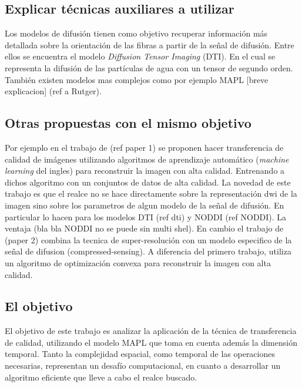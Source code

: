 \documentclass[a4paper,10pt]{article}
\begin{document}
\subsection{Explicar técnicas auxiliares a utilizar}
Los modelos de difusión tienen como objetivo recuperar información más detallada sobre la orientación de las fibras a 
partir de la señal de difusión. Entre ellos se encuentra el modelo \textit{Diffusion Tensor Imaging} (DTI). En el cual 
se representa la difusión de las partículas de agua con un tensor de segundo orden. También existen modelos mas 
complejos como por ejemplo MAPL [breve explicacion] (ref a Rutger). 

\subsection{Otras propuestas con el mismo objetivo}
Por ejemplo en el trabajo de (ref paper 1) se proponen hacer transferencia de 
calidad de imágenes utilizando algoritmos de aprendizaje automático 
(\textit{machine learning} del ingles) para reconstruir la imagen con alta 
calidad. Entrenando a dichos algoritmo con un conjuntos de datos de alta 
calidad. La novedad de este trabajo es que el realce no se hace directamente 
sobre la representación dwi de la imagen sino sobre los parametros de algun 
modelo de la señal de difusión. En particular lo hacen para los modelos DTI (ref 
dti) y NODDI (ref NODDI). La ventaja (bla bla NODDI no se puede sin multi 
shel). En cambio el trabajo de (paper 2) combina la tecnica de super-resolución 
con un modelo especifico de la señal de difusion (compressed-sensing). A 
diferencia del primero trabajo, utiliza un algoritmo de optimización convexa 
para reconstruir la imagen con alta calidad.

\subsection{El objetivo}
El objetivo de este trabajo es analizar la aplicación de la técnica de 
transferencia de calidad, utilizando el modelo MAPL que toma en cuenta además 
la dimensión temporal. Tanto la complejidad espacial, como temporal de las 
operaciones necesarias, representan un desafío computacional, en cuanto a 
desarrollar un algoritmo eficiente que lleve a cabo el realce buscado.





\clearpage


\end{document}
